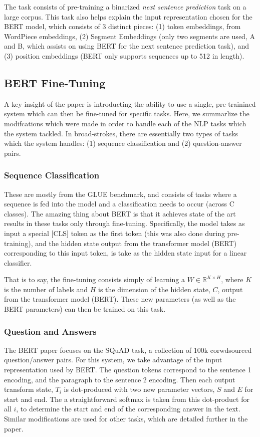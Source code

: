 \documentclass{article}
\begin{document}
The task consists of pre-training a binarized \textit{next sentence prediction} task on a large corpus. This task also helps explain the input representation chosen for the BERT model, which consists of 3 distinct pieces: (1) token embeddings, from WordPiece embeddings, (2) Segment Embeddings (only two segments are used, A and B, which assists on using BERT for the next sentence prediction task), and (3) position embeddings (BERT only supports sequences up to 512 in length).

\subsection{BERT Fine-Tuning}
A key insight of the paper is introducting the ability to use a single, pre-trainined system which can then be fine-tuned for specific tasks. Here, we summarlize the modifcations which were made in order to handle each of the NLP tasks which the system tackled. In broad-strokes, there are essentially two types of tasks which the system handles: (1) sequence classification and (2) question-answer pairs. 

\subsubsection{Sequence Classification}
These are mostly from the GLUE benchmark, and consists of tasks where a sequence is fed into the model and a classification needs to occur (across C classes). The amazing thing about BERT is that it achieves state of the art results in these tasks only through fine-tuning. Specifically, the model takes as input a special [CLS] token as the first token (this was also done during pre-training), and the hidden state output from the transformer model (BERT) corresponding to this input token, is take as the hidden state input for a linear classifier. 

That is to say, the fine-tuning consists simply of learning a $W \in \mathbb{R}^{K \times H}$, where $K$ is the number of labels and $H$ is the dimension of the hidden state, $C$, output from the transformer model (BERT). These new parameters (as well as the BERT parameters) can then be trained on this task.

\subsubsection{Question and Answers}
The BERT paper focuses on the SQuAD task, a collection of 100k corwdsourced question/answer pairs. For this system, we take advantage of the input representation used by BERT. The question tokens correspond to the sentence 1 encoding, and the paragraph to the sentence 2 encoding. Then each output transform state, $T_i$ is dot-produced with two new parameter vectors, $S$ and $E$ for start and end. The a straightforward softmax is taken from this dot-product for all $i$, to determine the start and end of the corresponding answer in the text. Similar modifications are used for other tasks, which are detailed further in the paper. 
\end{document}
